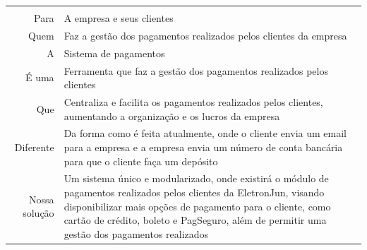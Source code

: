 \begin{table}[]
\centering
\label{label-epico03}
\begin{tabular}{
>{\columncolor[HTML]{96FFFB}}r l}
\multicolumn{2}{c}{\cellcolor[HTML]{34CDF9}Gerenciamento de pagamentos}                                                                                                                                                                                                                                             \\
Para                 & A empresa e seus clientes                                                                                                                                                                                                                                                        \\
Quem                 & Faz a gestão dos pagamentos realizados pelos clientes da empresa                                                                                                                                                                                                                 \\
A                    & Sistema de pagamentos                                                                                                                                                                                                                                                            \\
É uma                & Ferramenta que faz a gestão dos pagamentos realizados pelos clientes                                                                                                                                                                                                             \\
Que                  & Centraliza e facilita os pagamentos realizados pelos clientes, aumentando a organização e os lucros da empresa                                                                                                                                                                   \\
Diferente            & Da forma como é feita atualmente, onde o cliente envia um email para a empresa e a empresa envia um número de conta bancária para que o cliente faça um depósito                                                                                                                 \\
Nossa solução        & Um sistema único e modularizado, onde existirá o módulo de pagamentos realizados pelos clientes da EletronJun, visando disponibilizar mais opções de pagamento para o cliente, como cartão de crédito, boleto e PagSeguro, além de permitir uma gestão dos pagamentos realizados \\

\end{tabular}
\end{table}
